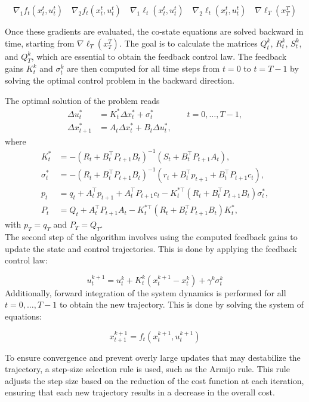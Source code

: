 \[
\nabla_1 f_t(x_t^t, u_t^t) \quad \nabla_2 f_t(x_t^t, u_t^t) \quad \nabla_1 \ell_t(x_t^t, u_t^t) \quad \nabla_2 \ell_t(x_t^t, u_t^t) \quad \nabla \ell_T(x_T^T)
\]

Once these gradients are evaluated, the co-state equations are solved backward in time, starting from \( \nabla \ell_T(x_T^T) \). The goal is to calculate the matrices \( Q_t^k \), \( R_t^k \), \( S_t^k \), and \( Q_T^k \), which are essential to obtain the feedback control law. The feedback gains \( K_t^k \) and \( \sigma_t^k \) are then computed for all time steps from \( t = 0 \) to \( t = T-1 \) by solving the optimal control problem in the backward direction.

The optimal solution of the problem reads
\begin{align*}
\Delta u_t^*      & = K_t^* \Delta x_t^* + \sigma_t^* \quad \quad \quad \quad t = 0, \ldots, T-1, \\
\Delta x_{t+1}^*  & = A_t \Delta x_t^* + B_t \Delta u_t^*,
\end{align*}
where
\begin{align*}
K_t^* & = -(R_t + B_t^\top P_{t+1} B_t)^{-1}(S_t + B_t^\top P_{t+1} A_t), \\
\sigma_t^* & = -(R_t + B_t^\top P_{t+1} B_t)^{-1}(r_t + B_t^\top p_{t+1} + B_t^\top P_{t+1} c_t), \\
p_t & = q_t + A_t^\top p_{t+1} + A_t^\top P_{t+1} c_t - K_t^{*\top} \left( R_t + B_t^\top P_{t+1} B_t \right) \sigma_t^*, \\
P_t & = Q_t + A_t^\top P_{t+1} A_t - K_t^{*\top} \left( R_t + B_t^\top P_{t+1} B_t \right) K_t^*,
\end{align*}
with \(p_T = q_T\) and \(P_T = Q_T\).
\\

The second step of the algorithm involves using the computed feedback gains to update the state and control trajectories. This is done by applying the feedback control law:

\[u^{k+1}_t = u^k_t + K^k_t \left(x^{k+1}_t - x^k_t\right) + \gamma^k \sigma^k_t
\]
Additionally, forward integration of the system dynamics is performed for all \( t = 0, \dots, T-1 \) to obtain the new trajectory. This is done by solving the system of equations:

\[x_{t+1}^{k+1} = f_t(x_t^{k+1}, u_t^{k+1})
\]
\[ \]

To ensure convergence and prevent overly large updates that may destabilize the trajectory, a step-size selection rule is used, such as the Armijo rule. This rule adjusts the step size based on the reduction of the cost function at each iteration, ensuring that each new trajectory results in a decrease in the overall cost.

